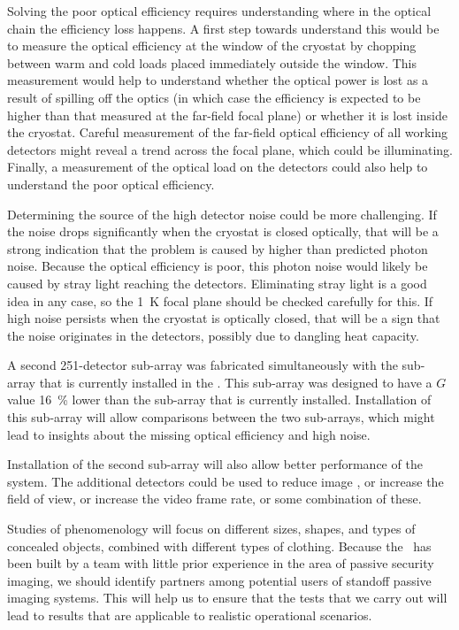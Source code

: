 Solving the poor optical efficiency requires understanding where in the optical chain the efficiency loss happens.
A first step towards understand this would be to measure the optical efficiency at the window of the cryostat by chopping between warm and cold loads placed immediately outside the window.
This measurement would help to understand whether the optical power is lost as a result of spilling off the optics (in which case the efficiency is expected to be higher than that measured at the far-field focal plane) or whether it is lost inside the cryostat.
Careful measurement of the far-field optical efficiency of all working detectors might reveal a trend across the focal plane, which could be illuminating.
Finally, a measurement of the optical load on the detectors could also help to understand the poor optical efficiency.

Determining the source of the high detector noise could be more challenging.
If the noise drops significantly when the cryostat is closed optically, that will be a strong indication that the problem is caused by higher than predicted photon noise.
Because the optical efficiency is poor, this photon noise would likely be caused by stray light reaching the detectors.
Eliminating stray light is a good idea in any case, so the \SI{1}{\K} focal plane should be checked carefully for this.
If high noise persists when the cryostat is optically closed, that will be a sign that the noise originates in the detectors, possibly due to dangling heat capacity.

A second 251-detector sub-array was fabricated simultaneously with the sub-array that is currently installed in the \Imager.
This sub-array was designed to have a $G$ value \SI{16}{\percent} lower than the sub-array that is currently installed.
Installation of this sub-array will allow comparisons between the two sub-arrays, which might lead to insights about the missing optical efficiency and high noise.


Installation of the second sub-array will also allow better performance of the system.
The additional detectors could be used to reduce image \NETD, or increase the field of view, or increase the video frame rate, or some combination of these.

Studies of phenomenology will focus on different sizes, shapes, and types of concealed objects, combined with different types of clothing.
Because the \Imager\ has been built by a team with little prior experience in the area of passive security imaging, we should identify partners among potential users of standoff passive imaging systems.
This will help us to ensure that the tests that we carry out will lead to results that are applicable to realistic operational scenarios.

